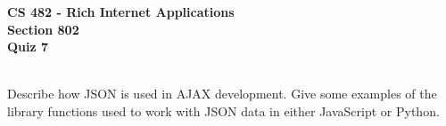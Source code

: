 \documentclass[letterpaper]{exam}
\begin{document}
\begin{center}
	\textbf{CS 482 - Rich Internet Applications} \\
	\textbf{Section 802} \\
	\textbf{Quiz 7} \\
	\vspace{5mm}
	 \\
\end{center}


\begin{questions}
	\question[10] Describe how JSON is used in AJAX development. Give some examples of the library functions used to work with JSON data in either JavaScript or Python.
		
\end{questions}
\end{document}
